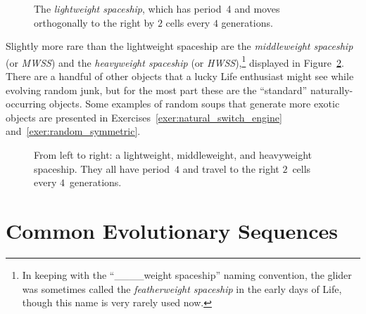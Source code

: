 \begin{figure}[!htb]
	\centering{}
	\caption{The \emph{lightweight spaceship}, which has period~4 and moves orthogonally to the right by $2$ cells every $4$ generations.}\label{fig:lwss}
\end{figure}

Slightly more rare than the lightweight spaceship are the \emph{middleweight spaceship} (or \emph{MWSS}) and the \emph{heavyweight spaceship} (or \emph{HWSS}),\footnote{In keeping with the ``\_\_\_\_weight spaceship'' naming convention, the glider was sometimes called the \emph{featherweight spaceship} in the early days of Life, though this name is very rarely used now.} displayed in Figure~\ref{fig:lwss_mwss_hwss}. There are a handful of other objects that a lucky Life enthusiast might see while evolving random junk, but for the most part these are the ``standard'' naturally-occurring objects. Some examples of random soups that generate more exotic objects are presented in Exercises~\ref{exer:natural_switch_engine} and~\ref{exer:random_symmetric}.

\begin{figure}[!htb]
	\centering{}
	\caption{From left to right: a lightweight, middleweight, and heavyweight spaceship. They all have period~$4$ and travel to the right $2$~cells every $4$~generations.}\label{fig:lwss_mwss_hwss}
\end{figure}


\section{Common Evolutionary Sequences}\label{sec:evolution}


